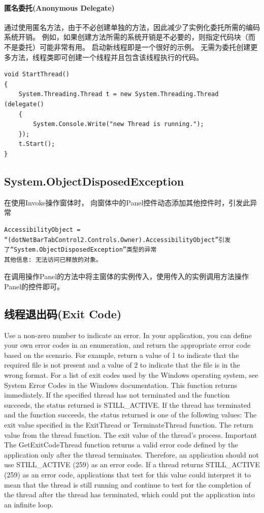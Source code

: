 \documentclass{book}
\begin{document}
\paragraph{匿名委托(Anonymous Delegate)}

通过使用匿名方法，由于不必创建单独的方法，因此减少了实例化委托所需的编码系统开销。
例如，如果创建方法所需的系统开销是不必要的，则指定代码块（而不是委托）可能非常有用。
启动新线程即是一个很好的示例。 无需为委托创建更多方法，线程类即可创建一个线程并且包含该线程执行的代码。

\begin{lstlisting}[language={[Sharp]C}]
void StartThread() 
{ 
	System.Threading.Thread t = new System.Threading.Thread (delegate() 
	{
		System.Console.Write("new Thread is running."); 
	}); 
	t.Start(); 
}
\end{lstlisting}


\subsection{System.ObjectDisposedException}

在使用Invoke操作窗体时，
向窗体中的Panel控件动态添加其他控件时，引发此异常

\begin{lstlisting}
AccessibilityObject = “(dotNetBarTabControl2.Controls.Owner).AccessibilityObject”引发了“System.ObjectDisposedException”类型的异常
其他信息: 无法访问已释放的对象。
\end{lstlisting}

在调用操作Panel的方法中将主窗体的实例传入，使用传入的实例调用方法操作Panel的控件即可。

\subsection{线程退出码(Exit Code)}

Use a non-zero number to indicate an error. In your application, 
you can define your own error codes in an enumeration, and return the appropriate error code based on the scenario. 
For example, return a value of 1 to indicate that the required file is not present and a value of 2 to indicate that the file is in the wrong format. 
For a list of exit codes used by the Windows operating system, see System Error Codes in the Windows documentation.
This function returns immediately. If the specified thread has not terminated and the function succeeds, 
the status returned is STILL\_ACTIVE. If the thread has terminated and the function succeeds, 
the status returned is one of the following values: The exit value specified in the ExitThread or TerminateThread function. 
The return value from the thread function. The exit value of the thread's process. 
Important The GetExitCodeThread function returns a valid error code defined by the application only after the thread terminates. Therefore, 
an application should not use STILL\_ACTIVE (259) as an error code. 
If a thread returns STILL\_ACTIVE (259) as an error code, 
applications that test for this value could interpret it to mean that the thread is still running and continue to test for the completion of the thread after the thread has terminated, which could put the application into an infinite loop.
\end{document}
